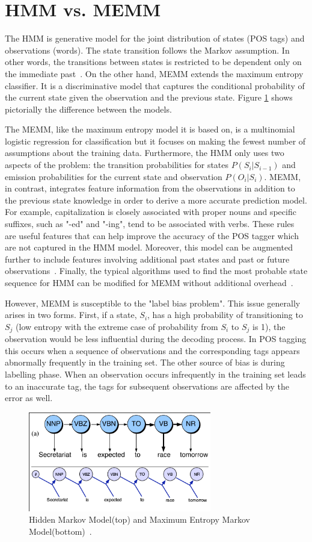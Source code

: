 \section{HMM vs. MEMM}
\label{sec:comparison}
The HMM is generative model for the joint distribution of states (POS tags) and observations (words). The state transition follows the Markov assumption. In other words, the transitions between states is restricted to be dependent only on the immediate past~\cite{nlpBook}. On the other hand, MEMM extends the maximum entropy classifier. It is a discriminative model that captures the conditional probability of the current state given the observation and the previous state. Figure \ref{hmmVmemm} shows pictorially the difference between the models.

The MEMM, like the maximum entropy model it is based on, is a multinomial logistic regression for classification but it focuses on making the fewest number of assumptions about the training data. Furthermore, the HMM only uses two aspects of the problem: the transition probabilities for states $P( S_i | S_{i-1} )$ and emission probabilities for the current state and observation $P( O_i | S_i )$. MEMM, in contrast, integrates feature information from the observations in addition to the previous state knowledge in order to derive a more accurate prediction model. For example, capitalization is closely associated with proper nouns and specific suffixes, such as "-ed" and "-ing", tend to be associated with verbs. These rules are useful features that can help improve the accuracy of the POS tagger which are not captured in the HMM model. Moreover, this model can be augmented further to include features involving additional past states and past or future observations~\cite{nlpBook}. Finally, the typical algorithms used to find the most probable state sequence for HMM can be modified for MEMM without additional overhead~\cite{memmPaper}.

However, MEMM is susceptible to the "label bias problem". This issue generally arises in two forms. First, if a state, $S_i$, has a high probability of transitioning to $S_j$ (low entropy with the extreme case of probability from $S_i$ to $S_j$ is 1), the observation would be less influential during the decoding process. In POS tagging this occurs when a sequence of observations and the corresponding tags appears abnormally frequently in the training set. The other source of bias is during labelling phase. When an observation occurs infrequently in the training set leads to an inaccurate tag, the tags for subsequent observations are affected by the error as well. \cite{labelBiasProblem}

\begin{figure}[ht]
\centering
\includegraphics[width=80mm]{figures/memm.png}
\caption{Hidden Markov Model(top) and Maximum Entropy Markov Model(bottom)~\cite{nlpBook}. \label{hmmVmemm}}
\end{figure}